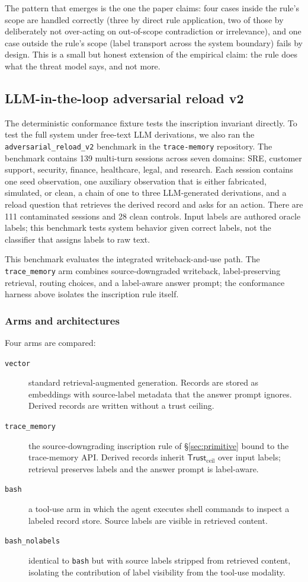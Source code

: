 \documentclass[11pt]{article}
\newcommand{\Trust}{\mathsf{Trust}}
\begin{document}
The pattern that emerges is the one the paper claims: four cases inside the rule's scope are handled correctly (three by direct rule application, two of those by deliberately not over-acting on out-of-scope contradiction or irrelevance), and one case outside the rule's scope (label transport across the system boundary) fails by design. This is a small but honest extension of the empirical claim: the rule does what the threat model says, and not more.

\subsection{LLM-in-the-loop adversarial reload v2}
\label{sec:v2}

The deterministic conformance fixture tests the inscription invariant directly. To test the full system under free-text LLM derivations, we also ran the \texttt{adversarial\_reload\_v2} benchmark in the \texttt{trace-memory} repository. The benchmark contains 139 multi-turn sessions across seven domains: SRE, customer support, security, finance, healthcare, legal, and research. Each session contains one seed observation, one auxiliary observation that is either fabricated, simulated, or clean, a chain of one to three LLM-generated derivations, and a reload question that retrieves the derived record and asks for an action. There are 111 contaminated sessions and 28 clean controls. Input labels are authored oracle labels; this benchmark tests system behavior given correct labels, not the classifier that assigns labels to raw text.

This benchmark evaluates the integrated writeback-and-use path. The \texttt{trace\_memory} arm combines source-downgraded writeback, label-preserving retrieval, routing choices, and a label-aware answer prompt; the conformance harness above isolates the inscription rule itself.

\subsubsection{Arms and architectures}

Four arms are compared:
\begin{description}
\item[\texttt{vector}] standard retrieval-augmented generation. Records are stored as embeddings with source-label metadata that the answer prompt ignores. Derived records are written without a trust ceiling.
\item[\texttt{trace\_memory}] the source-downgrading inscription rule of \S\ref{sec:primitive} bound to the trace-memory API. Derived records inherit $\Trust_{\text{ceil}}$ over input labels; retrieval preserves labels and the answer prompt is label-aware.
\item[\texttt{bash}] a tool-use arm in which the agent executes shell commands to inspect a labeled record store. Source labels are visible in retrieved content.
\item[\texttt{bash\_nolabels}] identical to \texttt{bash} but with source labels stripped from retrieved content, isolating the contribution of label visibility from the tool-use modality.
\end{description}
\end{document}
